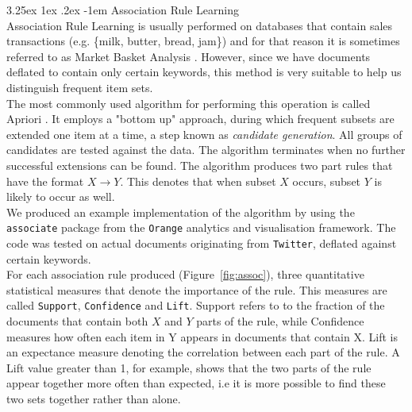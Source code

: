 \documentclass[12pt]{article}
\makeatletter
\renewcommand\paragraph{\@startsection{paragraph}{5}{\z@}%
  {3.25ex \@plus1ex \@minus.2ex}%
  {-1em}%
  {\normalfont\normalsize\bfseries}}
\makeatother
\begin{document}
\paragraph{Association Rule Learning}
\hfill \break 
\\
Association Rule Learning is usually performed on databases that contain sales transactions (e.g. \{milk, butter, bread, jam\}) and for that reason it is sometimes referred to as Market Basket Analysis \cite{assoc1}. However, since we have documents deflated to contain only certain keywords, this method is very suitable to help us distinguish frequent item sets. 
\hfill \break 
\\
The most commonly used algorithm for performing this operation is called Apriori \cite{apriori1}. It  employs a "bottom up" approach, during which frequent subsets are extended one item at a time, a step known as \textit{candidate generation}. All groups of candidates are tested against the data. The algorithm terminates when no further successful extensions can be found. The algorithm produces two part rules that have the format $X \rightarrow Y$. This denotes that when subset $X$ occurs, subset $Y$ is likely to occur as well.  \hfill \break 
\\
We produced an example implementation of the algorithm by using the \texttt{associate}\cite{orange-assoc} package from the \texttt{Orange}\cite{orange} analytics and visualisation framework. The code was tested on actual documents originating from \texttt{Twitter}, deflated against certain keywords.  \hfill \break 
\\
For each association rule produced (Figure~\ref{fig:assoc}), three quantitative statistical measures that denote the importance of the rule. This measures are called \texttt{Support}, \texttt{Confidence} and \texttt{Lift}. Support refers to to the fraction of the documents that contain both $X$ and $Y$ parts of the rule, while Confidence measures how often each item in Y appears in documents that contain X. Lift is an expectance measure denoting the correlation between each part of the rule. A Lift value greater than 1, for example, shows that the two parts of the rule appear together more often than expected, i.e it is more possible to find these two sets together rather than alone. 
\hfill \break 
\\
\end{document}
